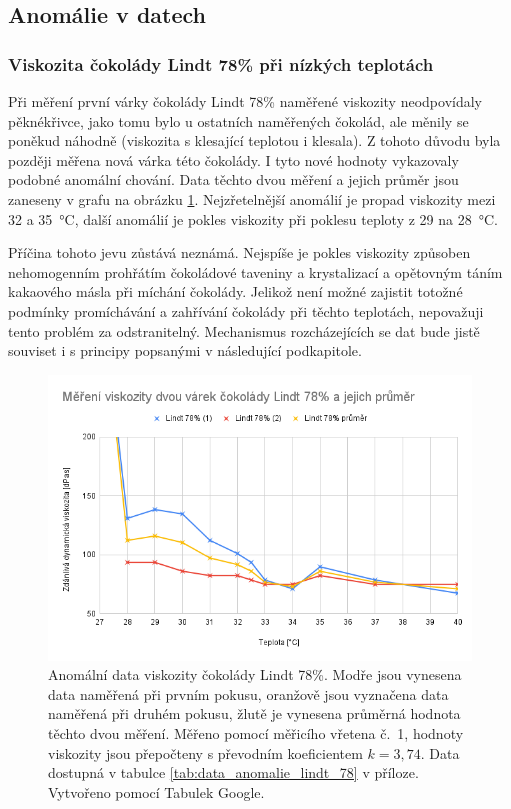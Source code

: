 \documentclass[12pt]{article}
\begin{document}
\subsection{Anomálie v datech}
\subsubsection{Viskozita čokolády Lindt 78\% při nízkých teplotách}

Při měření první várky čokolády Lindt 78\% naměřené viskozity neodpovídaly \glqq pěkné\grqq křivce, jako tomu bylo u ostatních naměřených čokolád, ale měnily se poněkud náhodně (viskozita s klesající teplotou i klesala). Z tohoto důvodu byla později měřena nová várka této čokolády. I tyto nové hodnoty vykazovaly podobné anomální chování. Data těchto dvou měření a jejich průměr jsou zaneseny v grafu na obrázku \ref{fig:Lindt_78_anomalie}. Nejzřetelnější anomálií je propad viskozity mezi 32 a \SI{35}{\degreeCelsius}, další anomálií je pokles viskozity při poklesu teploty z 29 na \SI{28}{\degreeCelsius}.
\par\noindent
Příčina tohoto jevu zůstává neznámá. Nejspíše je pokles viskozity způsoben nehomogenním prohřátím čokoládové taveniny a krystalizací a opětovným táním kakaového másla při míchání čokolády. Jelikož není možné zajistit totožné podmínky promíchávání a zahřívání čokolády při těchto teplotách, nepovažuji tento problém za odstranitelný. Mechanismus rozcházejících se dat bude jistě souviset i s principy popsanými v následující podkapitole.

\begin{figure}[h!]
    \centering
    \includegraphics[width = \linewidth]{figures/Lindt78.png}
    \caption{Anomální data viskozity čokolády Lindt 78\%. Modře jsou vynesena data naměřená při prvním pokusu, oranžově jsou vyznačena data naměřená při druhém pokusu, žlutě je vynesena průměrná hodnota těchto dvou měření. Měřeno pomocí měřicího vřetena č.~1, hodnoty viskozity jsou přepočteny s převodním koeficientem $k = 3,74$. Data dostupná v tabulce \ref{tab:data_anomalie_lindt_78} v příloze. Vytvořeno pomocí Tabulek Google.}
    \label{fig:Lindt_78_anomalie}
\end{figure}
\end{document}
